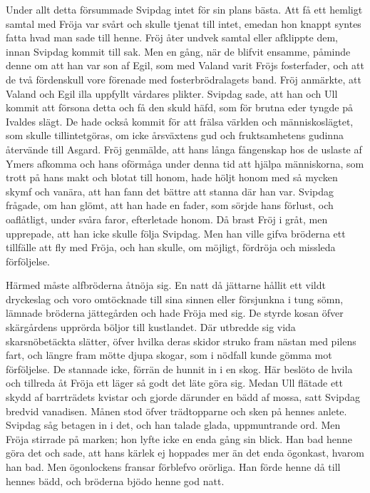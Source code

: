 Under allt detta försummade Svipdag intet för sin plans bästa. Att få
ett hemligt samtal med Fröja var svårt och skulle tjenat till intet,
emedan hon knappt syntes fatta hvad man sade till henne. Fröj åter
undvek samtal eller afklippte dem, innan Svipdag kommit till sak. Men en
gång, när de blifvit ensamme, påminde denne om att han var son af Egil,
som med Valand varit Fröjs fosterfader, och att de två fördenskull vore
förenade med fosterbrödralagets band. Fröj anmärkte, att Valand och Egil
illa uppfyllt vårdares plikter. Svipdag sade, att han och Ull kommit att
försona detta och få den skuld häfd, som för brutna eder tyngde på
Ivaldes slägt. De hade också kommit för att frälsa världen och
människoslägtet, som skulle tillintetgöras, om icke årsväxtens gud och
fruktsamhetens gudinna återvände till Asgard. Fröj genmälde, att hans
långa fångenskap hos de uslaste af Ymers afkomma och hans oförmåga under
denna tid att hjälpa människorna, som trott på hans makt och blotat till
honom, hade höljt honom med så mycken skymf och vanära, att han fann det
bättre att stanna där han var. Svipdag frågade, om han
glömt, att han hade en fader, som sörjde hans förlust, och oaflåtligt,
under svåra faror, efterletade honom. Då brast Fröj i gråt, men
upprepade, att han icke skulle följa Svipdag. Men han ville gifva
bröderna ett tillfälle att fly med Fröja, och han skulle, om möjligt,
fördröja och missleda förföljelse.

Härmed måste alfbröderna åtnöja sig. En natt då jättarne hållit ett
vildt dryckeslag och voro omtöcknade till sina sinnen eller försjunkna i
tung sömn, lämnade bröderna jättegården och hade Fröja med sig. De
styrde kosan öfver skärgårdens upprörda böljor till kustlandet. Där
utbredde sig vida skarsnöbetäckta slätter, öfver hvilka deras skidor
struko fram nästan med pilens fart, och längre fram mötte djupa skogar,
som i nödfall kunde gömma mot förföljelse. De stannade icke, förrän de
hunnit in i en skog. Här beslöto de hvila och tillreda åt Fröja ett
läger så godt det läte göra sig. Medan Ull flätade ett skydd af
barrträdets kvistar och gjorde därunder en bädd af mossa, satt Svipdag
bredvid vanadisen. Månen stod öfver trädtopparne och sken på hennes
anlete. Svipdag såg betagen in i det, och han talade glada, uppmuntrande
ord. Men Fröja stirrade på marken; hon lyfte icke en enda gång sin
blick. Han bad henne göra det och sade, att hans kärlek ej hoppades mer
än det enda ögonkast, hvarom han bad. Men ögonlockens fransar förblefvo
orörliga. Han förde henne då till hennes bädd, och bröderna bjödo henne
god natt.

